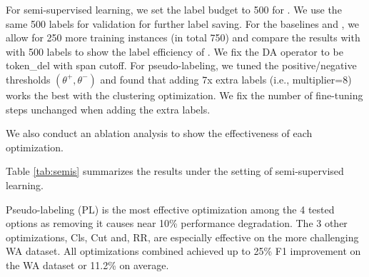 For semi-supervised learning, we set the label budget to 500 for \system.
We use the same 500 labels for validation for further label saving.
For the baselines \ditto and \rot, we allow for 250 more training instances (in total 750) 
and compare the results with \system with 500 labels to show the label efficiency of \system.
We fix the DA operator to be token\_del with span cutoff.
For pseudo-labeling, we tuned the positive/negative thresholds 
$(\theta^+, \theta^-)$ and found that adding 7x extra 
labels (i.e., multiplier=8)
works the best with the clustering optimization.
We fix the number of fine-tuning steps unchanged when adding the extra labels.




We also conduct an ablation analysis to show the effectiveness of each optimization.


Table \ref{tab:semis} summarizes the results under the setting of semi-supervised learning.

Pseudo-labeling (PL) is the most effective optimization
among the 4 tested options as removing it causes near 10\%
performance degradation. The 3 other optimizations,
Cls, Cut and, RR, are especially effective on the 
more challenging WA dataset. All optimizations combined
achieved up to 25\% F1 improvement on the WA dataset
or 11.2\% on average.




